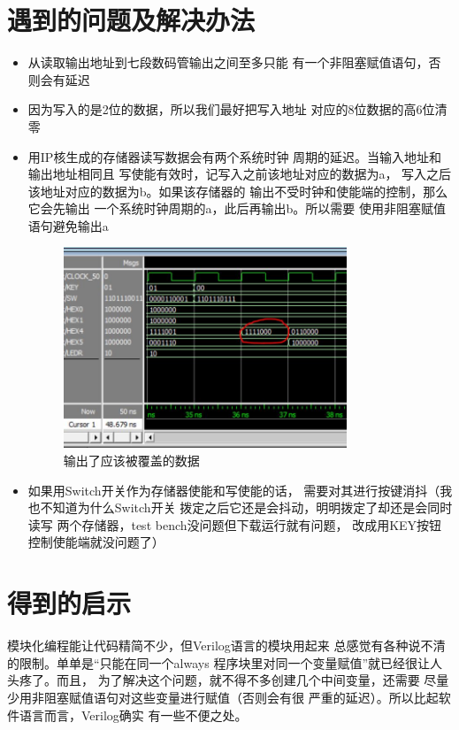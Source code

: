\documentclass[12pt,a4paper,UTF8]{article}
\begin{document}
\section{遇到的问题及解决办法}
\begin{itemize}
  \item 从读取输出地址到七段数码管输出之间至多只能
        有一个非阻塞赋值语句，否则会有延迟
  \item 因为写入的是2位的数据，所以我们最好把写入地址
        对应的8位数据的高6位清零
  \item 用IP核生成的存储器读写数据会有两个系统时钟
        周期的延迟。当输入地址和输出地址相同且
        写使能有效时，记写入之前该地址对应的数据为a，
        写入之后该地址对应的数据为b。如果该存储器的
        输出不受时钟和使能端的控制，那么它会先输出
        一个系统时钟周期的a，此后再输出b。所以需要
        使用非阻塞赋值语句避免输出a
        \begin{figure}[H]
          \centering
          \includegraphics[width=0.8\textwidth]{delay.JPG}
          \caption{输出了应该被覆盖的数据}
          \label{delay}
        \end{figure}
  \item 如果用Switch开关作为存储器使能和写使能的话，
        需要对其进行按键消抖（我也不知道为什么Switch开关
        拨定之后它还是会抖动，明明拨定了却还是会同时读写
        两个存储器，test bench没问题但下载运行就有问题，
        改成用KEY按钮控制使能端就没问题了）
\end{itemize}

\section{得到的启示}
模块化编程能让代码精简不少，但Verilog语言的模块用起来
总感觉有各种说不清的限制。单单是``只能在同一个always
程序块里对同一个变量赋值''就已经很让人头疼了。而且，
为了解决这个问题，就不得不多创建几个中间变量，还需要
尽量少用非阻塞赋值语句对这些变量进行赋值（否则会有很
严重的延迟）。所以比起软件语言而言，Verilog确实
有一些不便之处。
\end{document}
